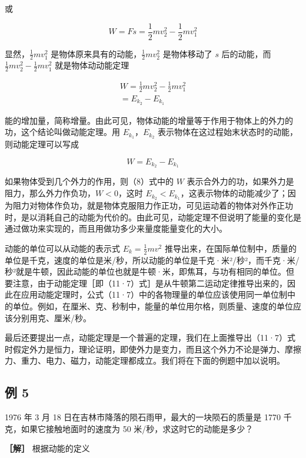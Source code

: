 或

\[
W = F s = \frac {1}{2} m v _ {2} ^ {2} - \frac {1}{2} m v _ {1} ^ {2} \tag {11.7}
\]

显然，\(\frac{1}{2} mv_1^2\)
是物体原来具有的动能，\(\frac{1}{2} mv_2^2\) 是物体移动了 \(s\)
后的动能，而 \(\frac{1}{2} mv_2^2 -\frac{1}{2} mv_1^2\)
就是物体动动能定理

\[
\begin{array}{l} W=\frac{1}{2}mv_{2}^{2}-\frac{1}{2}mv_{1}^{2}\\ =E_{k_{2}}-E_{k_{1}} \end{array}
\]

能的增加量，简称增量。由此可见，物体动能的增量等于作用于物体上的外力的功，这个结论叫做动能定理。用
\(E_{k_1}\)，\(E_{k_2}\)
表示物体在这过程始末状态时的动能，则动能定理可以写成

\[
W = E _ {k _ {2}} - E _ {k _ {1}} \tag {11.8}
\]

如果物体受到几个外力的作用，则（8）式中的 \(W\)
表示合外力的功，如果外力是阻力，那么外力作负功，\(W < 0\)，这时
\(E_{k_2} < E_{k_1}\)，这表示物体的动能减少了；因为阻力对物体作负功，就是物体克服阻力作正功，可见运动着的物体对外作正功时，是以消耗自己的动能为代价的。由此可见，动能定理不但说明了能量的变化是通过做功来实现的，而且用做功多少来量度能量变化的大小。

动能的单位可以从动能的表示式 \(E_{k} = \frac{1}{2} mv^{2}\)
推导出来，在国际单位制中，质量的单位是千克，速度的单位是米/秒，所以动能的单位是千克·米²/秒²，而千克·米/秒²就是牛顿，因此动能的单位也就是牛顿·米，即焦耳，与功有相同的单位。但要注意，由于动能定理［即（11·7）式］是从牛顿第二运动定律推导出来的，因此在应用动能定理时，公式（11·7）中的各物理量的单位应该使用同一单位制中的单位。例如，在厘米、克、秒制中，能量的单位用尔格，则质量、速度的单位应该分别用克、厘米/秒。

最后还要提出一点，动能定理是一个普遍的定理，我们在上面推导出（11·7）式时假定外力是恒力，理论证明，即使外力是变力，而且这个外力不论是弹力、摩擦力、重力、电力、磁力，动能定理都成立。我们将在下面的例题中加以说明。

\subsection{例 5}\label{ux4f8b-5-8}

1976 年 3 月 18 日在吉林市降落的陨石雨甲，最大的一块陨石的质量是 1770
千克，如果它接触地面时的速度为 50 米/秒，求这时它的动能是多少？

\textbf{［解］} 根据动能的定义

